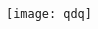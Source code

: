 \documentclass[10pt,A4]{ctexart}
\newcommand{\mpwidth}{\linewidth-\fboxsep-\fboxsep}
\newcommand{\cvtext}[1] {
	\begin{tabular*}{1\mpwidth}{p{0.98\mpwidth}}
		\parbox{1\mpwidth}{#1}
	\end{tabular*}
}
\newcommand{\cvsection}[1] {
	\vspace{14pt}
	\cvtext{
		\textbf{\LARGE{\textcolor{darkcol}{\uppercase{#1}}}}\\[-4pt]
		\textcolor{maincol}{ \rule{0.1\textwidth}{2pt} } \\
	}
}
\newcommand{\cvmetaevent}[4] {
	\textcolor{maincol} {\cvtext{\textbf{\begin{flushleft}#1\end{flushleft}}}}

	\ifthenelse{\isempty{#2}}{}{
	\textcolor{darkcol} {\cvtext{\textbf{#2}} }
	}

	\ifthenelse{\isempty{#3}}{}{
		\cvtext{{ \textcolor{darkcol} {#3} }}\\
	}

	\cvtext{#4}\\[14pt]
}
\newcommand{\cvqrcode}[1] {
	\begin{center}
		\texttt{[image: qdq]}
	\end{center}
}
\begin{document}
\begin{paracol}{2}
\begin{leftcolumn}
%
%
%
%
%

%
%
%
%
%
%

\newpage
\mbox{} %
\vfill
\cvqrcode{0.7}


\end{leftcolumn}
\end{paracol}
\end{document}
